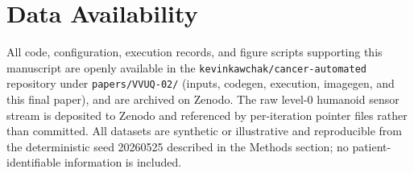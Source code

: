 \vspace{-0.1cm}

{}
\section*{Data Availability}
\label{sec:data}
\vspace{-0.15cm}
All code, configuration, execution records, and figure scripts supporting this
manuscript are openly available in the \texttt{kevinkawchak/cancer-automated}
repository under \texttt{papers/VVUQ-02/} (inputs, codegen, execution, imagegen,
and this final paper), and are archived on Zenodo. The raw level-0 humanoid sensor
stream is deposited to Zenodo and referenced by per-iteration pointer files rather
than committed. All datasets are synthetic or illustrative and reproducible from
the deterministic seed 20260525 described in the Methods section; no patient-identifiable
information is included.

